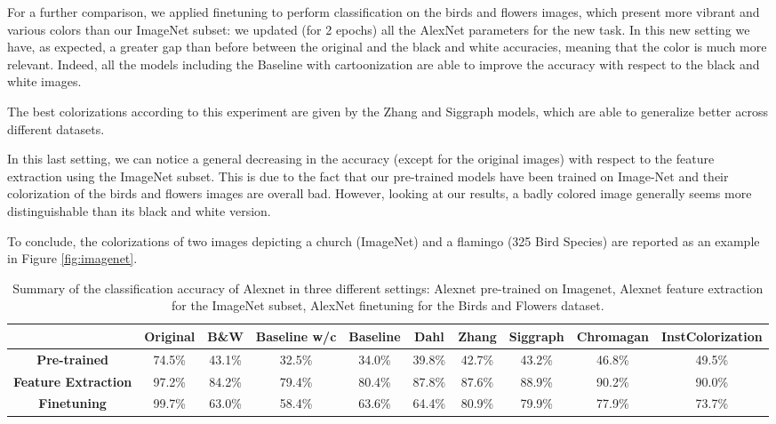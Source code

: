 For a further comparison, we applied finetuning to perform classification on the birds and flowers images, which present more vibrant and various colors than our ImageNet subset: we updated (for 2 epochs) all the AlexNet parameters for the new task. In this new setting we have, as expected, a greater gap than before between the original and the black and white accuracies, meaning that the color is much more relevant. Indeed, all the models including the Baseline with cartoonization are able to improve the accuracy with respect to the black and white images.

The best colorizations according to this experiment are given by the Zhang and Siggraph models, which are able to generalize better across different datasets.

In this last setting, we can notice a general decreasing in the accuracy (except for the original images) with respect to the feature extraction using the ImageNet subset. This is due to the fact that our pre-trained models have been trained on Image-Net and their colorization of the birds and flowers images are overall bad. However, looking at our results, a badly colored image generally seems more distinguishable than its black and white version.

To conclude, the colorizations of two images depicting a church (ImageNet) and a flamingo (325 Bird Species) are reported as an example in Figure \ref{fig:imagenet}.

\begin{table}[ht]
	\begin{center}
		\begin{adjustwidth}{-1cm}{}
			\begin{tabular}{c|ccccccccc}
				 &\textbf{Original} & \textbf{B\&W} & \textbf{Baseline w/c}&\textbf{Baseline} & \textbf{Dahl} & \textbf{Zhang} & \textbf{Siggraph} & \textbf{Chromagan} & \textbf{InstColorization}  \\
				\midrule
				\textbf{Pre-trained} & 74.5\% & 43.1\% & 32.5\% & 34.0\% & 39.8\% & 42.7\% & 43.2\% & 46.8\% & 49.5\% \\
				\midrule
				\textbf{Feature Extraction} & 97.2\% & 84.2\% & 79.4\% & 80.4\% & 87.8\% & 87.6\% &  88.9\%   &  90.2\% &       90.0\% \\
				\midrule
				\textbf{Finetuning} & 99.7\% & 63.0\% & 58.4\% & 63.6\% & 64.4\% & 80.9\% &  79.9\%   &  77.9\% &       73.7\% \\
			\end{tabular}
		\end{adjustwidth}
	\end{center}
	\caption{{\small  Summary of the classification accuracy of Alexnet in three different settings: Alexnet pre-trained on Imagenet, Alexnet feature extraction for the ImageNet subset, AlexNet finetuning for the Birds and Flowers dataset.}}
	\label{tab:pre-trained}
\end{table}

